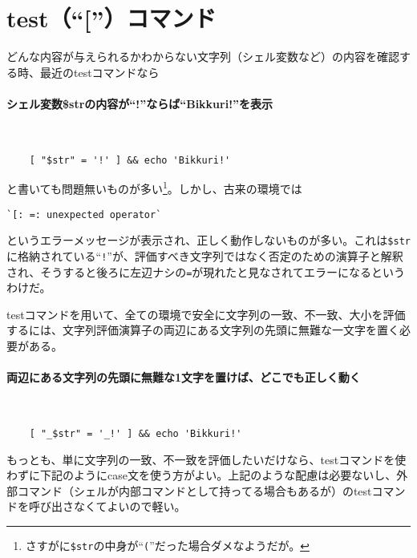 \section{test（``[''）コマンド}
\label{allenvs:test}

どんな内容が与えられるかわからない文字列（シェル変数など）の内容を確認する時、最近のtestコマンドなら

\paragraph{シェル変数\$strの内容が``!''ならば``Bikkuri!''を表示} 　\\
\begin{frameboxit}{160.0mm}
\begin{verbatim}
	[ "$str" = '!' ] && echo 'Bikkuri!'
\end{verbatim}
\end{frameboxit}

と書いても問題無いものが多い\footnote{さすがに\verb|$str|の中身が``\verb|(|''だった場合ダメなようだが。}。しかし、古来の環境では

\begin{screen}
	\verb|`[: =: unexpected operator`|
\end{screen}

というエラーメッセージが表示され、正しく動作しないものが多い。これは\verb|$str|に格納されている``\verb|!|''が、評価すべき文字列ではなく否定のための演算子と解釈され、そうすると後ろに左辺ナシの\verb|=|が現れたと見なされてエラーになるというわけだ。

testコマンドを用いて、全ての環境で安全に文字列の一致、不一致、大小を評価するには、文字列評価演算子の両辺にある文字列の先頭に無難な一文字を置く必要がある。

\paragraph{両辺にある文字列の先頭に無難な1文字を置けば、どこでも正しく動く} 　\\
\begin{frameboxit}{160.0mm}
\begin{verbatim}
	[ "_$str" = '_!' ] && echo 'Bikkuri!'
\end{verbatim}
\end{frameboxit}

もっとも、単に文字列の一致、不一致を評価したいだけなら、testコマンドを使わずに下記のようにcase文を使う方がよい。上記のような配慮は必要ないし、外部コマンド（シェルが内部コマンドとして持ってる場合もあるが）のtestコマンドを呼び出さなくてよいので軽い。

